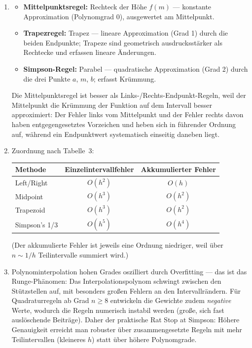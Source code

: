 \documentclass[a4paper,11pt]{scrartcl}
\begin{document}
\begin{enumerate}[label=(\alph*)]
  \item
  \begin{itemize}[nosep]
    \item \textbf{Mittelpunktsregel:} Rechteck der Höhe $f(m)$ --- konstante Approximation (Polynomgrad 0), ausgewertet am Mittelpunkt.
    \item \textbf{Trapezregel:} Trapez --- lineare Approximation (Grad 1) durch die beiden Endpunkte; Trapeze sind \glqq geometrisch ausdrucksstärker als Rechtecke\grqq{} und erfassen lineare Änderungen.
    \item \textbf{Simpson-Regel:} Parabel --- quadratische Approximation (Grad 2) durch die drei Punkte $a$, $m$, $b$; erfasst Krümmung.
  \end{itemize}
  Die Mittelpunktsregel ist besser als Links-/Rechts-Endpunkt-Regeln, weil der Mittelpunkt die Krümmung der Funktion auf dem Intervall besser approximiert: Der Fehler links vom Mittelpunkt und der Fehler rechts davon haben entgegengesetztes Vorzeichen und heben sich in führender Ordnung auf, während ein Endpunktwert systematisch einseitig daneben liegt.
  \item Zuordnung nach Tabelle~3:
  \begin{center}
  \begin{tabular}{lcc}
  \toprule
  Methode & Einzelintervallfehler & Akkumulierter Fehler \\
  \midrule
  Left/Right & $O(h^2)$ & $O(h)$ \\
  Midpoint & $O(h^3)$ & $O(h^2)$ \\
  Trapezoid & $O(h^3)$ & $O(h^2)$ \\
  Simpson's 1/3 & $O(h^5)$ & $O(h^4)$ \\
  \bottomrule
  \end{tabular}
  \end{center}
  (Der akkumulierte Fehler ist jeweils eine Ordnung niedriger, weil über $n \sim 1/h$ Teilintervalle summiert wird.)
  \item Polynominterpolation hohen Grades oszilliert durch Overfitting --- das ist das Runge-Phänomen: Das Interpolationspolynom schwingt zwischen den Stützstellen auf, mit besonders großen Fehlern an den Intervallrändern. Für Quadraturregeln ab Grad $n \geq 8$ entwickeln die Gewichte zudem \emph{negative} Werte, wodurch die Regeln numerisch instabil werden (große, sich fast auslöschende Beiträge). Daher der praktische Rat \glqq Stop at Simpson\grqq: Höhere Genauigkeit erreicht man robuster über zusammengesetzte Regeln mit mehr Teilintervallen (kleineres $h$) statt über höhere Polynomgrade.
\end{enumerate}
\end{document}
